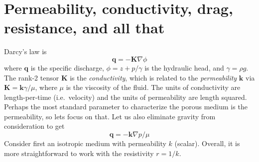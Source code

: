 \documentclass[11pt]{article}
\newcommand{\td}[2] { \frac{d #1} { d #2 } }
\newcommand{\grad}{\nabla}
\newcommand{\bvec}[1]{\ensuremath{\boldsymbol{#1}}}
\newcommand{\nhat}{\hat{\bvec{n}}}
\newcommand {\bq} {\bvec{q}}
\begin{document}
\begin{comment}
\subsubsection{The center of mass}
Consider the body's center of mass
\begin{equation}
(x_{cm}, y_{cm}) = \frac{1}{A} \iint (x, y) \, dA
\end{equation}
I did a calculation to determine the motion of the center of mass, given the interface velocity. The result that I get is
\begin{equation}
\td{}{t} (x_{cm}, y_{cm})  = -\frac{1}{A} \int (x(s), y(s)) V_n(s) \, ds
\end{equation}
I believe the sign is correct for $\nhat$ the inward pointing normal, so that $V_n$ is positive if the body is shrinking.
To calculate the center of mass, I can use the divergence theorem
\begin{equation}
\iint \grad \cdot \bvec{F} \, dA = \int \bvec{F} \cdot \nhat \, ds
\end{equation}
Take $\bvec{F} = \frac{1}{2} (x^2, y^2)$, so that $\grad \cdot \bvec{F} = (x,y)$. Then
\begin{equation}
(x_{cm}, y_{cm} ) = \frac{1}{2 A} \int x^2 n_x + y^2 n_y \, ds
\end{equation}
To calculate the total area, $A$, I can use the divergence theorem again, to get
\begin{equation}
A = \int x n_x ds = \int y n_y ds
\end{equation}
\end{comment}


\section{Permeability, conductivity, drag, resistance, and all that}

Darcy's law is
\begin{equation}
\bq = - \bvec{K} \grad \phi
\end{equation}
where $\bq$ is the specific discharge, $\phi = z + p/\gamma$ is the hydraulic head, and $\gamma = \rho g$. The rank-2 tensor $\bvec{K}$ is the {\em conductivity}, which is related to the {\em permeability} $\bvec{k}$ via $\bvec{K} = \bvec{k} \gamma/\mu$, where $\mu$ is the viscosity of the fluid. The units of conductivity are length-per-time (i.e.~velocity) and the units of permeability are length squared.
Perhaps the most standard parameter to characterize the porous medium is the permeability, so lets focus on that. Let us also eliminate gravity from consideration to get
\begin{equation}
\bq = - \bvec{k} \grad p / \mu
\end{equation}
Consider first an isotropic medium with permeability $k$ (scalar). Overall, it is more straightforward to work with the resistivity $r = 1/k$.
\end{document}
